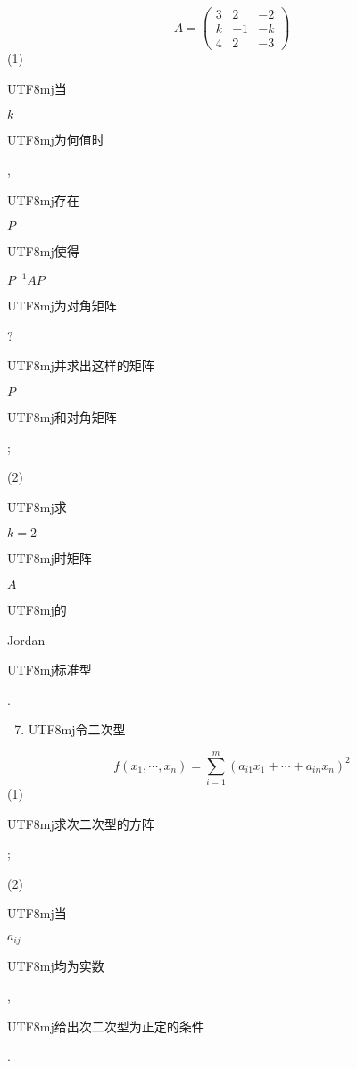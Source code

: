 \documentclass[10pt]{article}
\begin{document}
$$
A=\left(\begin{array}{ccc}
3 & 2 & -2 \\
k & -1 & -k \\
4 & 2 & -3
\end{array}\right)
$$
(1) \begin{CJK}{UTF8}{mj}当\end{CJK} $k$ \begin{CJK}{UTF8}{mj}为何值时\end{CJK}, \begin{CJK}{UTF8}{mj}存在\end{CJK} $P$ \begin{CJK}{UTF8}{mj}使得\end{CJK} $P^{-1} A P$ \begin{CJK}{UTF8}{mj}为对角矩阵\end{CJK}? \begin{CJK}{UTF8}{mj}并求出这样的矩阵\end{CJK} $P$ \begin{CJK}{UTF8}{mj}和对角矩阵\end{CJK};

(2) \begin{CJK}{UTF8}{mj}求\end{CJK} $k=2$ \begin{CJK}{UTF8}{mj}时矩阵\end{CJK} $A$ \begin{CJK}{UTF8}{mj}的\end{CJK} Jordan \begin{CJK}{UTF8}{mj}标准型\end{CJK}.

\begin{enumerate}
  \setcounter{enumi}{6}
  \item \begin{CJK}{UTF8}{mj}令二次型\end{CJK}
\end{enumerate}
$$
f\left(x_{1}, \cdots, x_{n}\right)=\sum_{i=1}^{m}\left(a_{i 1} x_{1}+\cdots+a_{i n} x_{n}\right)^{2}
$$
(1) \begin{CJK}{UTF8}{mj}求次二次型的方阵\end{CJK};

(2) \begin{CJK}{UTF8}{mj}当\end{CJK} $a_{i j}$ \begin{CJK}{UTF8}{mj}均为实数\end{CJK}, \begin{CJK}{UTF8}{mj}给出次二次型为正定的条件\end{CJK}.
\end{document}
